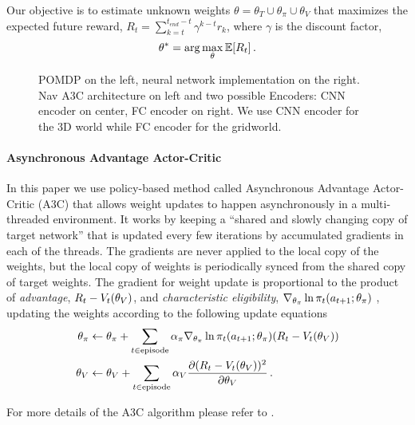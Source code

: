 Our objective is to estimate unknown weights $\theta = \theta_T \cup \theta_\pi \cup \theta_V$ that maximizes the expected future reward, $R_t = \sum_{k=t}^{t_{end} - t} \gamma^{k-t} r_k$, where $\gamma$ is the discount factor,
%
\begin{align}
\theta^* = \arg\max_{\theta} \mathbb{E}[R_t] \,.
\end{align}
%
\def\svgwidth{0.25\columnwidth}%
\begin{figure}%
%
\def\svgwidth{0.25\columnwidth}%
%
\hspace{-1ex}%
\hspace{-1ex}%
%
\caption{POMDP on the left, neural network implementation on the right. Nav A3C architecture on left and two possible Encoders: CNN encoder on center, FC encoder on right. We use CNN encoder for the 3D world while FC encoder for the gridworld.
}
\end{figure}

\paragraph{Asynchronous Advantage Actor-Critic}
\def\charelig{\nabla_{\theta_\pi}\ln \pit(\acttn; \theta_\pi)}
In this paper we use policy-based method called Asynchronous Advantage Actor-Critic (A3C) \cite{MnBaMiICML2016} that allows weight updates to happen asynchronously in a multi-threaded environment.
It works by keeping a ``shared and slowly changing copy of target network'' that is updated every few iterations by accumulated gradients in each of the threads.
The gradients are never applied to the local copy of the weights, but the local copy of weights is periodically synced from the shared copy of target weights.
The gradient for weight update is proportional to the product of \emph{advantage}, $R_t - V_t(\theta_V)$, and \emph{characteristic eligibility}, $\charelig$ \cite{WiML1992}, updating the weights according to the following update equations
\begin{align}
  \theta_\pi &\leftarrow \theta_\pi
  + \sum_{t \in \text{episode}}\alpha_\pi \charelig (R_t - \Value_t(\theta_\Value))
  \\
  \theta_\Value &\leftarrow \theta_\Value
  + \sum_{t \in \text{episode}} \alpha_\Value \frac{\partial (R_t - \Value_t(\theta_\Value))^2}
                  {\partial\theta_\Value}
                  \, .
\end{align}

For more details of the A3C algorithm please refer to \cite{MnBaMiICML2016}.
